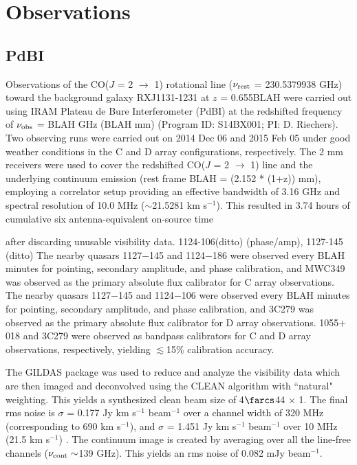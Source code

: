 \documentclass[]{emulateapj}
\begin{document}
\author{Draft}


\section{Observations}
\subsection{PdBI} \label{sec:PdBIdata}
Observations of the CO($J$ = 2 $\rightarrow$ 1) rotational line ($\nu_{\rm
rest}$ = 230.5379938 GHz) toward the background galaxy RXJ1131-1231 at $z$ = 
0.655BLAH
 were carried out using IRAM Plateau de Bure Interferometer (PdBI) at the
redshifted frequency of $\nu_{\rm obs}$ = 
 BLAH GHz (BLAH mm) (Program ID: S14BX001; PI: D. Riechers). 
 Two observing runs were carried out on 2014 Dec 06 and 2015 Feb 05 under good
weather conditions in the C and D array configurations, respectively. The 2 mm
receivers were used to cover the redshifted CO($J$ = 2 $\rightarrow$ 1) line
and the 
underlying continuum emission (rest frame BLAH = (2.152 * (1+z)) mm), employing
a correlator setup providing an effective bandwidth of 3.16 GHz and spectral 
resolution of 10.0 MHz ($\sim$21.5281 km s$^{-1}$).
This resulted in 3.74 hours of cumulative six antenna-equivalent on-source time

after discarding unusable visibility data.
1124-106(ditto)
(phase/amp), 1127-145 (ditto)
The nearby quasars 1127$-$145 and 1124$-$186 were observed every BLAH minutes
for
pointing, secondary amplitude, and phase calibration, and MWC349 was observed
as the primary
absolute flux calibrator for C array observations.
The nearby quasars 1127$-$145 and 1124$-$106 were observed every BLAH minutes
for
pointing, secondary amplitude, and phase calibration, and 3C279 was observed as
the primary
absolute flux calibrator for D array observations.
1055$+$018 and 3C279 were observed as bandpass calibrators for C and D array
observations, respectively, yielding $\lesssim
$15\% calibration accuracy.

The GILDAS package was used to reduce and analyze the visibility data which are
then imaged and deconvolved using
the CLEAN algorithm with ``natural" weighting. This yields a synthesized clean
beam size of 4$\farcs$44 $\times$ 1. The final rms noise is $\sigma$ =
0.177 
Jy km s$^{-1}$ beam$^{-1}$ over a channel width of 320 MHz (corresponding to
690 km s$^{-1}$), and $\sigma$ = 1.451 Jy km s$^{-1}$ beam$^{-1}$ over 10 MHz 
(21.5 km s$^{-1}$) . 
The continuum image is created by %
averaging over all the line-free channels ($\nu_{\rm cont}\sim$139 GHz). This
yields an rms noise of 0.082 mJy beam$^{-1}$. %
\end{document}
